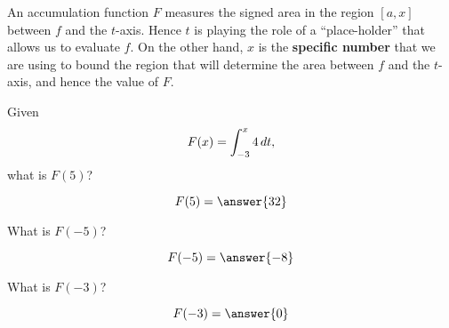\documentclass{ximera}
\begin{document}
An accumulation function $F$ measures the signed area in the region
$[a,x]$ between $f$ and the $t$-axis. Hence $t$ is playing the role of
a ``place-holder'' that allows us to evaluate $f$. On the other hand,
$x$ is the \textbf{specific number} that we are using to bound the
region that will determine the area between $f$ and the $t$-axis, and
hence the value of $F$.
\begin{question}
  Given
  \[
  F(x) = \int_{-3}^x 4 \,d t,
  \]
  what is $F(5)$?
  \begin{prompt}
    \[
    F(5) = \answer{32}
    \]
  \end{prompt}
  \begin{question}
    What is $F(-5)$?
    \begin{prompt}
      \[
      F(-5) = \answer{-8}
      \]
    \end{prompt}
  \end{question}
  \begin{question}
    What is $F(-3)$?
    \begin{prompt}
      \[
      F(-3) = \answer{0}
      \]
    \end{prompt}
  \end{question}
\end{question}
\end{document}
